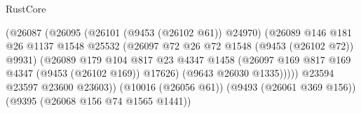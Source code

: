 \begin{lexlean}{RustCore}
\begin{coremodule}
                                                    (@26087
                                                      (@26095
                                                        (@26101 (@9453 (@26102 @61)) @24970)
                                                        (@26089
                                                          @146
                                                          @181
                                                          @26
                                                          @1137
                                                          @1548
                                                          @25532
                                                          (@26097
                                                            @72
                                                            @26
                                                            @72
                                                            @1548
                                                            (@9453 (@26102 @72))
                                                            @9931)
                                                          (@26089
                                                            @179
                                                            @104
                                                            @817
                                                            @23
                                                            @4347
                                                            @1458
                                                            (@26097
                                                              @169
                                                              @817
                                                              @169
                                                              @4347
                                                              (@9453 (@26102 @169))
                                                              @17626)
                                                            (@9643 @26030 @1335)))))
                                                    @23594
                                                    @23597
                                                    @23600
                                                    @23603))
                                                (@10016 (@26056 @61))
                                                (@9493 (@26061 @369 @156))
                                                (@9395 (@26068 @156 @74 @1565 @1441))

\end{coremodule}
\end{lexlean}
